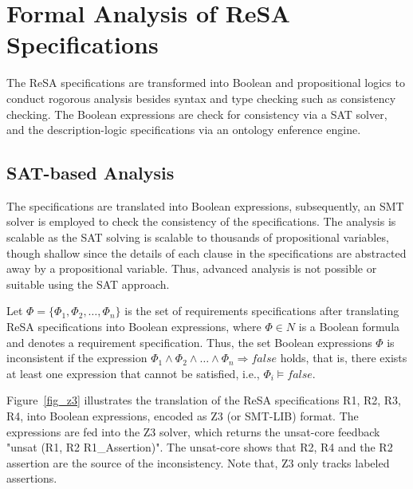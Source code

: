 \section{Formal Analysis of ReSA Specifications}\label{rc_resaanalysis}
The ReSA specifications are transformed into Boolean and propositional logics to conduct rogorous analysis besides syntax and type checking such as consistency checking. The Boolean expressions are check for consistency via a SAT solver, and the description-logic specifications via an ontology enference engine. 

\subsection{SAT-based Analysis}
The specifications are translated into Boolean expressions, subsequently, an SMT solver is employed to check the consistency of the specifications. The analysis is scalable as the SAT solving is scalable to thousands of propositional variables, though shallow since the details of each clause in the specifications are abstracted away by a propositional variable. Thus, advanced analysis is not possible or suitable using the SAT approach.%
\begin{definition}
	Let $\Phi = \{\Phi_1, \Phi_2,\dots,\Phi_n\}$ is the set of requirements specifications after translating ReSA specifications into Boolean expressions, where  $\Phi\in N$ is a Boolean formula and denotes a requirement specification. Thus, the set Boolean expressions $\Phi$ is inconsistent if the expression $\Phi_1 \land \Phi_2 \land\dots\land \Phi_n \Rightarrow false$ holds, that is, there exists at least one expression that cannot be satisfied, i.e., $\Phi_i\models false$.
\end{definition}
\begin{example}
Figure~\ref{fig_z3} illustrates the translation of the ReSA specifications R1, R2, R3, R4, into Boolean expressions, encoded as Z3 (or SMT-LIB) format. %
The expressions are fed into the Z3 solver, which returns the unsat-core feedback "unsat (R1, R2 R1\_Assertion)". The unsat-core shows that R2, R4 and the R2 assertion are the source of the inconsistency. Note that, Z3 only tracks labeled assertions.
\end{example}
